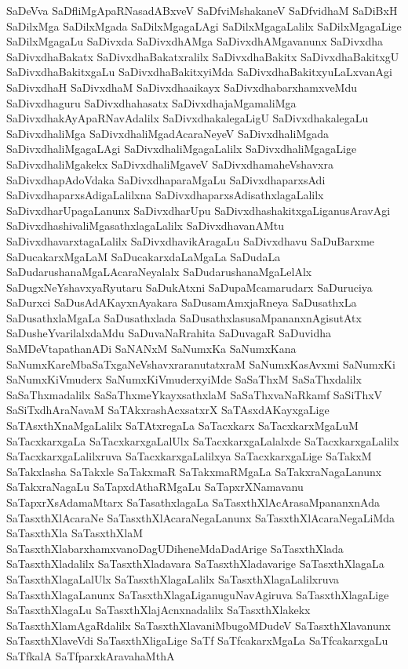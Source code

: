{SaDeVva
SaDfliMgApaRNasadABxveV
SaDfviMshakaneV
SaDfvidhaM
SaDiBxH
SaDilxMga
SaDilxMgada
SaDilxMgagaLAgi
SaDilxMgagaLalilx
SaDilxMgagaLige
SaDilxMgagaLu
SaDivxda
SaDivxdhAMga
SaDivxdhAMgavanunx
SaDivxdha
SaDivxdhaBakatx
SaDivxdhaBakatxralilx
SaDivxdhaBakitx
SaDivxdhaBakitxgU
SaDivxdhaBakitxgaLu
SaDivxdhaBakitxyiMda
SaDivxdhaBakitxyuLaLxvanAgi
SaDivxdhaH
SaDivxdhaM
SaDivxdhaaikayx
SaDivxdhabarxhamxveMdu
SaDivxdhaguru
SaDivxdhahasatx
SaDivxdhajaMgamaliMga
SaDivxdhakAyApaRNavAdalilx
SaDivxdhakalegaLigU
SaDivxdhakalegaLu
SaDivxdhaliMga
SaDivxdhaliMgadAcaraNeyeV
SaDivxdhaliMgada
SaDivxdhaliMgagaLAgi
SaDivxdhaliMgagaLalilx
SaDivxdhaliMgagaLige
SaDivxdhaliMgakekx
SaDivxdhaliMgaveV
SaDivxdhamaheVshavxra
SaDivxdhapAdoVdaka
SaDivxdhaparaMgaLu
SaDivxdhaparxsAdi
SaDivxdhaparxsAdigaLalilxna
SaDivxdhaparxsAdisathxlagaLalilx
SaDivxdharUpagaLanunx
SaDivxdharUpu
SaDivxdhashakitxgaLiganusAravAgi
SaDivxdhashivaliMgasathxlagaLalilx
SaDivxdhavanAMtu
SaDivxdhavarxtagaLalilx
SaDivxdhavikAragaLu
SaDivxdhavu
SaDuBarxme
SaDucakarxMgaLaM
SaDucakarxdaLaMgaLa
SaDudaLa
SaDudarushanaMgaLAcaraNeyalalx
SaDudarushanaMgaLelAlx
SaDugxNeYshavxyaRyutaru
SaDukAtxni
SaDupaMcamarudarx
SaDuruciya
SaDurxci
SaDusAdAKayxnAyakara
SaDusamAmxjaRneya
SaDusathxLa
SaDusathxlaMgaLa
SaDusathxlada
SaDusathxlasusaMpananxnAgisutAtx
SaDusheYvarilalxdaMdu
SaDuvaNaRrahita
SaDuvagaR
SaDuvidha
SaMDeVtapathanADi
SaNANxM
SaNumxKa
SaNumxKana
SaNumxKareMbaSaTxgaNeVshavxraranutatxraM
SaNumxKasAvxmi
SaNumxKi
SaNumxKiVmuderx
SaNumxKiVmuderxyiMde
SaSaThxM
SaSaThxdalilx
SaSaThxmadalilx
SaSaThxmeYkayxsathxlaM
SaSaThxvaNaRkamf
SaSiThxV
SaSiTxdhAraNavaM
SaTAkxrashAcxsatxrX
SaTAsxdAKayxgaLige
SaTAsxthXnaMgaLalilx
SaTAtxregaLa
SaTacxkarx
SaTacxkarxMgaLuM
SaTacxkarxgaLa
SaTacxkarxgaLalUlx
SaTacxkarxgaLalalxde
SaTacxkarxgaLalilx
SaTacxkarxgaLalilxruva
SaTacxkarxgaLalilxya
SaTacxkarxgaLige
SaTakxM
SaTakxlasha
SaTakxle
SaTakxmaR
SaTakxmaRMgaLa
SaTakxraNagaLanunx
SaTakxraNagaLu
SaTapxdAthaRMgaLu
SaTapxrXNamavanu
SaTapxrXsAdamaMtarx
SaTasathxlagaLa
SaTasxthXlAcArasaMpananxnAda
SaTasxthXlAcaraNe
SaTasxthXlAcaraNegaLanunx
SaTasxthXlAcaraNegaLiMda
SaTasxthXla
SaTasxthXlaM
SaTasxthXlabarxhamxvanoDagUDiheneMdaDadArige
SaTasxthXlada
SaTasxthXladalilx
SaTasxthXladavara
SaTasxthXladavarige
SaTasxthXlagaLa
SaTasxthXlagaLalUlx
SaTasxthXlagaLalilx
SaTasxthXlagaLalilxruva
SaTasxthXlagaLanunx
SaTasxthXlagaLiganuguNavAgiruva
SaTasxthXlagaLige
SaTasxthXlagaLu
SaTasxthXlajAcnxnadalilx
SaTasxthXlakekx
SaTasxthXlamAgaRdalilx
SaTasxthXlavaniMbugoMDudeV
SaTasxthXlavanunx
SaTasxthXlaveVdi
SaTasxthXligaLige
SaTf
SaTfcakarxMgaLa
SaTfcakarxgaLu
SaTfkalA
SaTfparxkAravahaMthA
}
